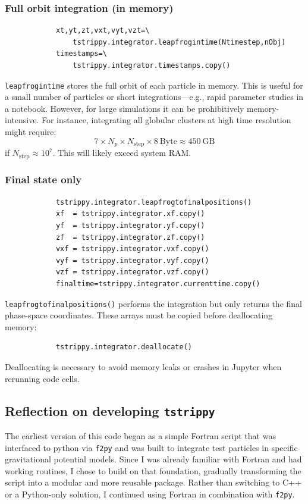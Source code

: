        \subsubsection*{Full orbit integration (in memory)}
        \small
        \begin{lstlisting}
            xt,yt,zt,vxt,vyt,vzt=\
                tstrippy.integrator.leapfrogintime(Ntimestep,nObj) 
            timestamps=\
                tstrippy.integrator.timestamps.copy()
        \end{lstlisting}
        \normalsize
        \texttt{leapfrogintime} stores the full orbit of each particle in memory. This is useful for a small number of particles or short integrations—e.g., rapid parameter studies in a notebook. However, for large simulations it can be prohibitively memory-intensive. For instance, integrating all globular clusters at high time resolution might require:
        \begin{equation}
            7 \times N_p \times N_\mathrm{step} \times 8~\mathrm{Byte} \approx 450~\mathrm{GB}
        \end{equation}
        if $N_\mathrm{step} \approx 10^7$. This will likely exceed system RAM.

        \subsubsection*{Final state only}
        \small
        \begin{lstlisting}
            tstrippy.integrator.leapfrogtofinalpositions()
            xf  = tstrippy.integrator.xf.copy()
            yf  = tstrippy.integrator.yf.copy()
            zf  = tstrippy.integrator.zf.copy()
            vxf = tstrippy.integrator.vxf.copy()
            vyf = tstrippy.integrator.vyf.copy()
            vzf = tstrippy.integrator.vzf.copy()
            finaltime=tstrippy.integrator.currenttime.copy()
        \end{lstlisting}
        \normalsize
        \texttt{leapfrogtofinalpositions()} performs the integration but only returns the final phase-space coordinates. These arrays must be copied before deallocating memory:
        \small
        \begin{lstlisting}
            tstrippy.integrator.deallocate()
        \end{lstlisting}
        \normalsize
        Deallocating is necessary to avoid memory leaks or crashes in Jupyter when rerunning code cells.

    \subsection{Reflection on developing \texttt{tstrippy}}
        The earliest version of this code began as a simple Fortran script that was interfaced to python via \texttt{f2py} and was built to integrate test particles in specific gravitational potential models. Since I was already familiar with Fortran and had working routines, I chose to build on that foundation, gradually transforming the script into a modular and more reusable package. Rather than switching to C++ or a Python-only solution, I continued using Fortran in combination with \texttt{f2py}.

